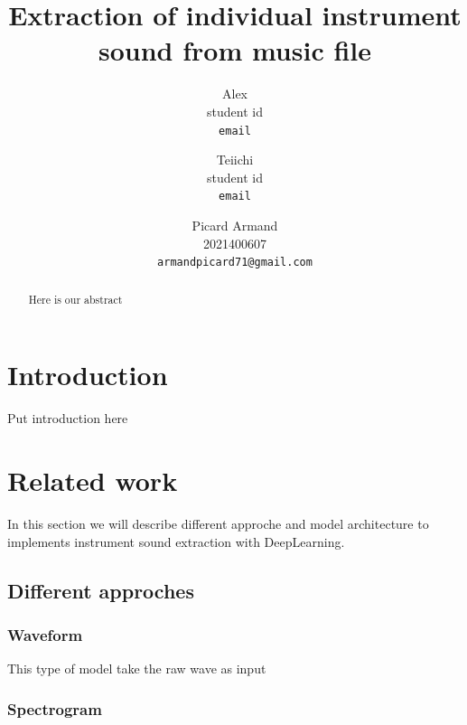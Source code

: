 \documentclass[final]{cvpr}
\begin{document}
\title{Extraction of individual instrument sound from music file}

\author{Alex\\
student id\\
{\tt\small email}
\and
Teiichi\\
student id\\
{\tt\small email}
\and
Picard Armand\\
2021400607\\
{\tt\small armandpicard71@gmail.com}
}

\maketitle


\begin{abstract}
Here is our abstract
\end{abstract}

\section{Introduction}

Put introduction here

\section{Related work}

In this section we will describe different approche and model architecture to implements instrument sound extraction with DeepLearning.

\subsection{Different approches}
\subsubsection{Waveform}

This type of model take the raw wave as input

\subsubsection{Spectrogram}
\end{document}
